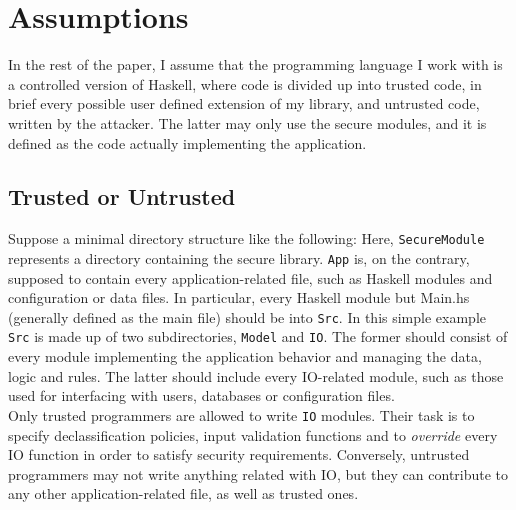\section{Assumptions}\label{sec:assumptions}
In the rest of the paper, I assume that the programming language I work with is a controlled version of Haskell, where code is divided up into trusted code, in brief every possible user defined extension of my library, and untrusted code, written by the attacker. The latter may only use the secure modules, and it is defined as the code actually implementing the application. 

\subsection{Trusted or Untrusted}
Suppose a minimal directory structure like the following:
Here, \texttt{SecureModule} represents a directory containing the secure library. \texttt{App} is, on the contrary, supposed to contain every application-related file, such as Haskell modules and configuration or data files. In particular, every Haskell module but Main.hs (generally defined as the main file) should be into \texttt{Src}. In this simple example \texttt{Src} is made up of two subdirectories, \texttt{Model} and \texttt{IO}. The former should consist of every module implementing the application behavior and managing the data, logic and rules. The latter should include every IO-related module, such as those used for interfacing with users, databases or configuration files. \\
Only trusted programmers are allowed to write \texttt{IO} modules. Their task is to specify declassification policies, input validation functions and to \textit{override} every IO function in order to satisfy security requirements. Conversely, untrusted programmers may not write anything related with IO, but they can contribute to any other application-related file, as well as trusted ones.